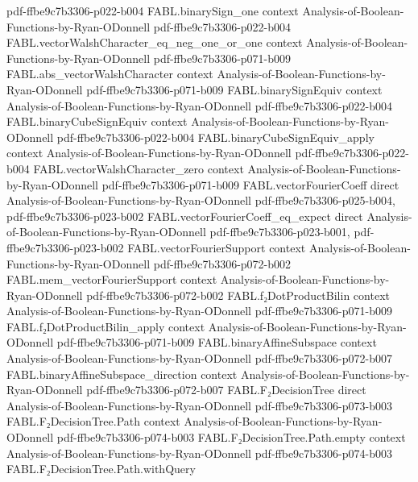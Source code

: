 \begin{theorem}
  {pdf-ffbe9c7b3306-p022-b004}
\proofstep
  {FABL.binarySign_one}
  {context}
  {Analysis-of-Boolean-Functions-by-Ryan-ODonnell}
  {pdf-ffbe9c7b3306-p022-b004}
\proofstep
  {FABL.vectorWalshCharacter_eq_neg_one_or_one}
  {context}
  {Analysis-of-Boolean-Functions-by-Ryan-ODonnell}
  {pdf-ffbe9c7b3306-p071-b009}
\proofstep
  {FABL.abs_vectorWalshCharacter}
  {context}
  {Analysis-of-Boolean-Functions-by-Ryan-ODonnell}
  {pdf-ffbe9c7b3306-p071-b009}
\proofstep
  {FABL.binarySignEquiv}
  {context}
  {Analysis-of-Boolean-Functions-by-Ryan-ODonnell}
  {pdf-ffbe9c7b3306-p022-b004}
\proofstep
  {FABL.binaryCubeSignEquiv}
  {context}
  {Analysis-of-Boolean-Functions-by-Ryan-ODonnell}
  {pdf-ffbe9c7b3306-p022-b004}
\proofstep
  {FABL.binaryCubeSignEquiv_apply}
  {context}
  {Analysis-of-Boolean-Functions-by-Ryan-ODonnell}
  {pdf-ffbe9c7b3306-p022-b004}
\proofstep
  {FABL.vectorWalshCharacter_zero}
  {context}
  {Analysis-of-Boolean-Functions-by-Ryan-ODonnell}
  {pdf-ffbe9c7b3306-p071-b009}
\proofstep
  {FABL.vectorFourierCoeff}
  {direct}
  {Analysis-of-Boolean-Functions-by-Ryan-ODonnell}
  {pdf-ffbe9c7b3306-p025-b004,
    pdf-ffbe9c7b3306-p023-b002}
\proofstep
  {FABL.vectorFourierCoeff_eq_expect}
  {direct}
  {Analysis-of-Boolean-Functions-by-Ryan-ODonnell}
  {pdf-ffbe9c7b3306-p023-b001,
    pdf-ffbe9c7b3306-p023-b002}
\proofstep
  {FABL.vectorFourierSupport}
  {context}
  {Analysis-of-Boolean-Functions-by-Ryan-ODonnell}
  {pdf-ffbe9c7b3306-p072-b002}
\proofstep
  {FABL.mem_vectorFourierSupport}
  {context}
  {Analysis-of-Boolean-Functions-by-Ryan-ODonnell}
  {pdf-ffbe9c7b3306-p072-b002}
\proofstep
  {FABL.f₂DotProductBilin}
  {context}
  {Analysis-of-Boolean-Functions-by-Ryan-ODonnell}
  {pdf-ffbe9c7b3306-p071-b009}
\proofstep
  {FABL.f₂DotProductBilin_apply}
  {context}
  {Analysis-of-Boolean-Functions-by-Ryan-ODonnell}
  {pdf-ffbe9c7b3306-p071-b009}
\proofstep
  {FABL.binaryAffineSubspace}
  {context}
  {Analysis-of-Boolean-Functions-by-Ryan-ODonnell}
  {pdf-ffbe9c7b3306-p072-b007}
\proofstep
  {FABL.binaryAffineSubspace_direction}
  {context}
  {Analysis-of-Boolean-Functions-by-Ryan-ODonnell}
  {pdf-ffbe9c7b3306-p072-b007}
\proofstep
  {FABL.F₂DecisionTree}
  {direct}
  {Analysis-of-Boolean-Functions-by-Ryan-ODonnell}
  {pdf-ffbe9c7b3306-p073-b003}
\proofstep
  {FABL.F₂DecisionTree.Path}
  {context}
  {Analysis-of-Boolean-Functions-by-Ryan-ODonnell}
  {pdf-ffbe9c7b3306-p074-b003}
\proofstep
  {FABL.F₂DecisionTree.Path.empty}
  {context}
  {Analysis-of-Boolean-Functions-by-Ryan-ODonnell}
  {pdf-ffbe9c7b3306-p074-b003}
\proofstep
  {FABL.F₂DecisionTree.Path.withQuery}

\end{theorem}
